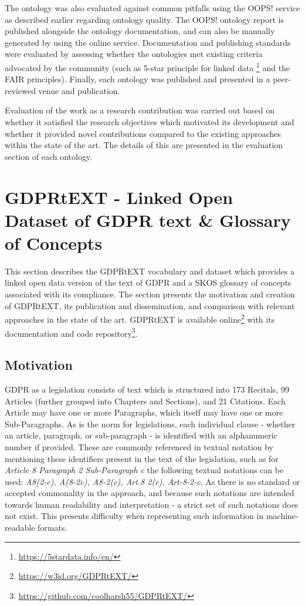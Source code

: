 The ontology was also evaluated against common pitfalls using the OOPS! service as described earlier regarding ontology quality. The OOPS! ontology report is published alongside the ontology documentation, and can also be manually generated by using the online service. Documentation and publishing standards were evaluated by assessing whether the ontologies met existing criteria advocated by the community (such as 5-star principle for linked data \footnote{\url{https://5stardata.info/en/}} and the FAIR principles). Finally, each ontology was published and presented in a peer-reviewed venue and publication.

Evaluation of the work as a research contribution was carried out based on whether it satisfied the research objectives which motivated its development and whether it provided novel contributions compared to the existing approaches within the state of the art. The details of this are presented in the evaluation section of each ontology.

\section{GDPRtEXT - Linked Open Dataset of GDPR text \& Glossary of Concepts}\label{sec:voc:GDPRtEXT}

This section describes the GDPRtEXT vocabulary and dataset which provides a linked open data version of the text of GDPR and a SKOS glossary of concepts associated with its compliance. The section presents the motivation and creation of GDPRtEXT, its publication and dissemination, and comparison with relevant approaches in the state of the art. GDPRtEXT is available online\footnote{\url{https://w3id.org/GDPRtEXT/}} with its documentation and code repository\footnote{\url{https://github.com/coolharsh55/GDPRtEXT/}}.

\subsection{Motivation}
GDPR as a legislation consists of text which is structured into 173 Recitals, 99 Articles (further grouped into Chapters and Sections), and 21 Citations. Each Article may have one or more Paragraphs, which itself may have one or more Sub-Paragraphs. As is the norm for legislations, each individual clause - whether an article, paragraph, or sub-paragraph - is identified with an alphanumeric number if provided. These are commonly referenced in textual notation by mentioning these identifiers present in the text of the legislation, such as for \textit{Article 8 Paragraph 2 Sub-Paragraph c} the following textual notations can be used: \textit{A8(2-c), A(8-2c), A8-2(c), Art.8 2(c), Art-8-2-c}. As there is no standard or accepted commonality in the approach, and because such notations are intended towards human readability and interpretation - a strict set of such notations does not exist. This presents difficulty when representing such information in machine-readable formats.

